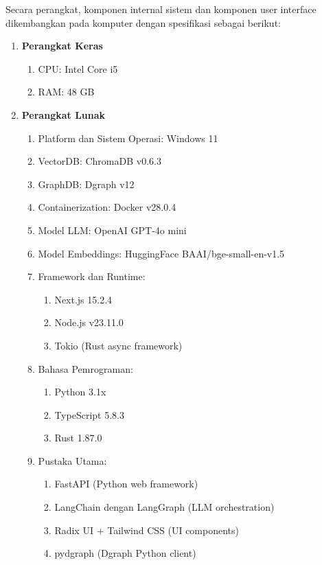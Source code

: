 Secara perangkat, komponen internal sistem dan komponen user interface dikembangkan pada komputer dengan spesifikasi sebagai berikut:
\begin{enumerate}
    \item \textbf{Perangkat Keras}
    \begin{enumerate}
        \item CPU: Intel Core i5
        \item RAM: 48 GB
    \end{enumerate}
    \item \textbf{Perangkat Lunak}
    \begin{enumerate}
        \item Platform dan Sistem Operasi: Windows 11
        \item VectorDB: ChromaDB v0.6.3
        \item GraphDB: Dgraph v12
        \item Containerization: Docker v28.0.4
        \item Model LLM: OpenAI GPT-4o mini
        \item Model Embeddings: HuggingFace BAAI/bge-small-en-v1.5
        \item Framework dan Runtime:
        \begin{enumerate}
            \item Next.js 15.2.4
            \item Node.js v23.11.0
            \item Tokio (Rust async framework)
        \end{enumerate}
        \item Bahasa Pemrograman:
        \begin{enumerate}
            \item Python 3.1x
            \item TypeScript 5.8.3
            \item Rust 1.87.0
        \end{enumerate}
        \item Pustaka Utama:
        \begin{enumerate}
            \item FastAPI (Python web framework)
            \item LangChain dengan LangGraph (LLM orchestration)
            \item Radix UI + Tailwind CSS (UI components)
            \item pydgraph (Dgraph Python client)
        \end{enumerate}
    \end{enumerate}
\end{enumerate}